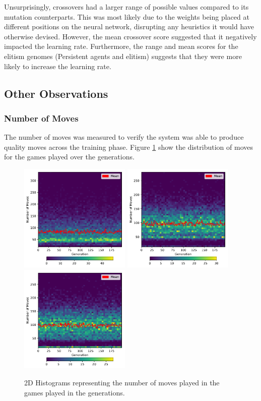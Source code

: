 \documentclass[12pt,a4paper]{article}
\begin{document}
        Unsurprisingly, crossovers had a larger range of possible values compared to its mutation counterparts. This was most likely due to the weights being placed at different positions on the neural network, disrupting any heuristics it would have otherwise devised. However, the mean crossover score suggested that it negatively impacted the learning rate. Furthermore, the range and mean scores for the elitism genomes (Persistent agents and elitism) suggests that they were more likely to increase the learning rate.

    \subsection{Other Observations}
        \subsubsection{Number of Moves}
            The number of moves was measured to verify the system was able to produce quality moves across the training phase. Figure \ref{move_chart} show the distribution of moves for the games played over the generations.

            \begin{figure}[!ht]
                \centering
                \includegraphics[width=53mm]{images/results/1ply/moves.pdf}
                \includegraphics[width=53mm]{images/results/3ply/moves.pdf}
                \includegraphics[width=53mm]{images/results/6ply/moves.pdf}
                \caption{2D Histograms representing the number of moves played in the games played in the generations. \label{move_chart}}
            \end{figure}
\end{document}
